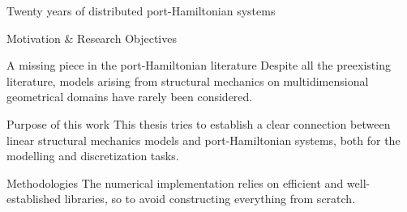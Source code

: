 \documentclass[aspectratio=169]{ISAE-Beamer}
\begin{document}
\begin{frame}{Twenty years of distributed port-Hamiltonian systems}
\end{frame}

\begin{frame}{Motivation \& Research Objectives}

\begin{alertblock}{A missing piece in the port-Hamiltonian literature}
Despite all the preexisting literature, models arising from structural mechanics on multidimensional geometrical domains have rarely been considered. 
\end{alertblock}

\begin{block}{Purpose of this work}
This thesis tries to establish a clear connection between linear structural mechanics models
and port-Hamiltonian systems, both for the modelling and discretization tasks.
\end{block}

\begin{exampleblock}{Methodologies}
The numerical implementation relies on efficient and well-established libraries, so to avoid constructing everything from scratch.
\end{exampleblock}

\end{frame}
\end{document}
